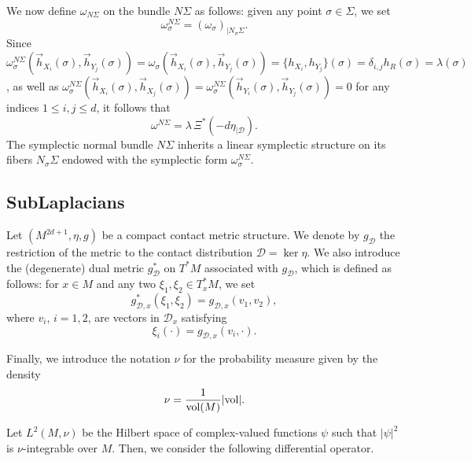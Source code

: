 \documentclass[12pt,a4paper]{amsart}
\theoremstyle{plain}
\theoremstyle{definition}
\theoremstyle{remark}
\numberwithin{equation}{section}
\theoremstyle{definition}
\def \cD{\mathcal{D}}
\numberwithin{equation}{section}
\begin{document}

We now define $\omega_{N\Sigma}$ on the bundle $N\Sigma$ as follows: given any point $\sigma\in\Sigma$, we set 
$$
\omega_\sigma^{N\Sigma} = (\omega_\sigma)_{\vert N_\sigma\Sigma} .
$$
Since $\omega_\sigma^{N\Sigma}(\vec h_{X_i}(\sigma),\vec h_{Y_j}(\sigma)) = \omega_\sigma(\vec h_{X_i}(\sigma),\vec h_{Y_j}(\sigma))=\{h_{X_i},h_{Y_j}\}(\sigma)=\delta_{i,j}h_R(\sigma)=\lambda(\sigma)$, as well as 
$\omega_\sigma^{N\Sigma}(\vec h_{X_i}(\sigma),\vec h_{X_j}(\sigma)) = \omega_\sigma^{N\Sigma}(\vec h_{Y_i}(\sigma),\vec h_{Y_j}(\sigma)) =0$ for any indices $1\leq i,j\leq d$, it follows that
$$
\omega^{N\Sigma} = \lambda\, \Xi^* (-d\eta_{\vert \cD}).
$$
The symplectic normal bundle $N\Sigma$ inherits a linear symplectic structure on its fibers $N_\sigma\Sigma$ endowed with the symplectic form $\omega_\sigma^{N\Sigma}$.

\subsection{SubLaplacians}
\label{subsect:sublaplacian}

Let $(M^{2d+1},\eta,g)$ be a compact contact metric structure. We denote by $g_\cD$ the restriction of the metric to the contact distribution $\cD = \ker \eta$. We also introduce the (degenerate) dual metric $g_{\cD}^*$ on $T^* M$ associated with $g_\cD$, which is defined as follows: for $x\in M$ and any two $\xi_1, \xi_2\in T_x^* M$, we set
\begin{equation*}
    g_{\cD,x}^*(\xi_1,\xi_2)=g_{\cD,x}(v_1,v_2),
\end{equation*}
where $v_i$, $i=1,2$, are vectors in $\cD_x$ satisfying
\begin{equation*}
    \xi_i(\cdot) = g_{\cD,x}(v_i,\cdot).
\end{equation*}

Finally, we introduce the notation $\nu$ for the probability measure given by the density
\begin{equation*}
 \nu = \frac{1}{{\rm vol}(M)}|{\rm vol}|.
\end{equation*}

Let $L^2(M,\nu)$ be the Hilbert space of complex-valued functions $\psi$ such that $|\psi|^2$ is $\nu$-integrable over $M$. 
Then, we consider the following differential operator.
\end{document}
